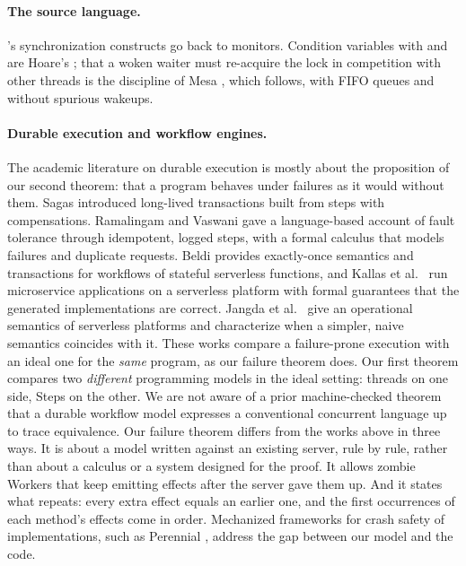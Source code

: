 \paragraph{The source language.}
\Lang{}'s synchronization constructs go back to monitors. Condition
variables with  and  are Hoare's
\cite{hoare1974monitors}; that a woken waiter must re-acquire the lock in
competition with other threads is the discipline of Mesa
\cite{lampson1980mesa}, which \Lang{} follows, with FIFO queues and without
spurious wakeups.

\paragraph{Durable execution and workflow engines.}
The academic literature on durable execution is mostly about the
proposition of our second theorem: that a program behaves under failures
as it would without them. Sagas \cite{garciamolina1987sagas} introduced
long-lived transactions built from steps with compensations. Ramalingam and
Vaswani \cite{ramalingam2013idempotence} gave a language-based account of
fault tolerance through idempotent, logged steps, with a formal calculus
that models failures and duplicate requests. Beldi
\cite{zhang2020beldi} provides exactly-once semantics and transactions for
workflows of stateful serverless functions, and Kallas et al.\
\cite{kallas2023mu2sls} run microservice applications on a serverless
platform with formal guarantees that the generated implementations are
correct. Jangda et al.\ \cite{jangda2019serverless} give an operational
semantics of serverless platforms and characterize when a simpler, naive
semantics coincides with it. These works compare a failure-prone
execution with an ideal one for the \emph{same} program, as our failure
theorem does. Our first theorem compares two \emph{different} programming
models in the ideal setting: threads on one side, Steps on the other. We
are not aware of a prior machine-checked theorem that a durable workflow
model expresses a conventional concurrent language up to trace
equivalence. Our failure theorem differs from the works above in three
ways. It is about a model written against an existing
server, rule by rule, rather than about a calculus or a system designed
for the proof. It allows zombie Workers that keep emitting effects after
the server gave them up. And it states what repeats: every extra effect
equals an earlier one, and the first occurrences of each method's effects
come in order. Mechanized frameworks for crash safety of implementations,
such as Perennial \cite{chajed2019perennial}, address the gap between
our model and the code.
